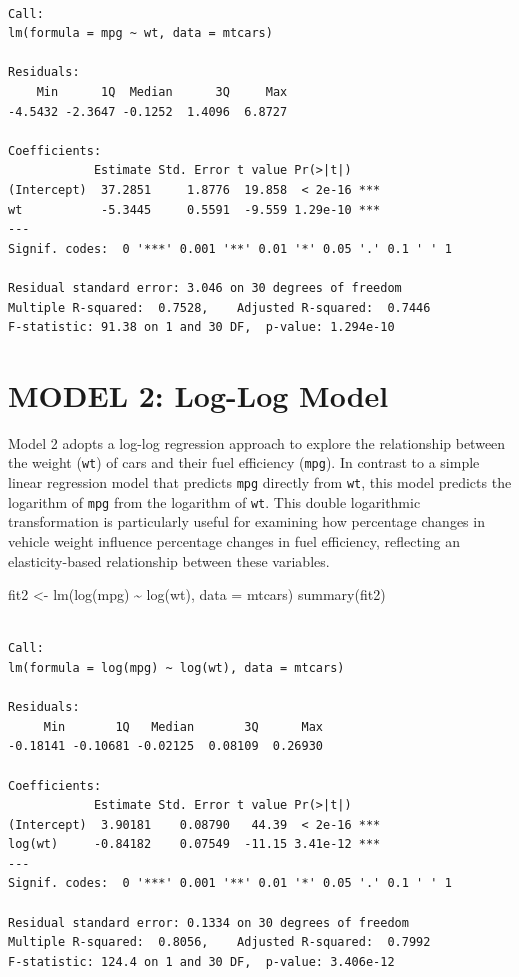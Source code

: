 \documentclass[
  letterpaper,
  DIV=11,
  numbers=noendperiod]{scrreport}
\newenvironment{Shaded}{\begin{snugshade}}{\end{snugshade}}
\newcommand{\AttributeTok}[1]{\textcolor[rgb]{0.40,0.45,0.13}{#1}}
\newcommand{\FunctionTok}[1]{\textcolor[rgb]{0.28,0.35,0.67}{#1}}
\newcommand{\NormalTok}[1]{\textcolor[rgb]{0.00,0.23,0.31}{#1}}
\newcommand{\OtherTok}[1]{\textcolor[rgb]{0.00,0.23,0.31}{#1}}
\newcommand{\SpecialCharTok}[1]{\textcolor[rgb]{0.37,0.37,0.37}{#1}}
\begin{document}
\begin{verbatim}

Call:
lm(formula = mpg ~ wt, data = mtcars)

Residuals:
    Min      1Q  Median      3Q     Max 
-4.5432 -2.3647 -0.1252  1.4096  6.8727 

Coefficients:
            Estimate Std. Error t value Pr(>|t|)    
(Intercept)  37.2851     1.8776  19.858  < 2e-16 ***
wt           -5.3445     0.5591  -9.559 1.29e-10 ***
---
Signif. codes:  0 '***' 0.001 '**' 0.01 '*' 0.05 '.' 0.1 ' ' 1

Residual standard error: 3.046 on 30 degrees of freedom
Multiple R-squared:  0.7528,    Adjusted R-squared:  0.7446 
F-statistic: 91.38 on 1 and 30 DF,  p-value: 1.294e-10
\end{verbatim}

\section{MODEL 2: Log-Log Model}\label{model-2-log-log-model}

Model 2 adopts a log-log regression approach to explore the relationship
between the weight (\texttt{wt}) of cars and their fuel efficiency
(\texttt{mpg}). In contrast to a simple linear regression model that
predicts \texttt{mpg} directly from \texttt{wt}, this model predicts the
logarithm of \texttt{mpg} from the logarithm of \texttt{wt}. This double
logarithmic transformation is particularly useful for examining how
percentage changes in vehicle weight influence percentage changes in
fuel efficiency, reflecting an elasticity-based relationship between
these variables.

\begin{Shaded}
\begin{Highlighting}[]
\NormalTok{fit2 }\OtherTok{\textless{}{-}} \FunctionTok{lm}\NormalTok{(}\FunctionTok{log}\NormalTok{(mpg) }\SpecialCharTok{\textasciitilde{}} \FunctionTok{log}\NormalTok{(wt), }\AttributeTok{data =}\NormalTok{ mtcars)}
\FunctionTok{summary}\NormalTok{(fit2)}
\end{Highlighting}
\end{Shaded}

\begin{verbatim}

Call:
lm(formula = log(mpg) ~ log(wt), data = mtcars)

Residuals:
     Min       1Q   Median       3Q      Max 
-0.18141 -0.10681 -0.02125  0.08109  0.26930 

Coefficients:
            Estimate Std. Error t value Pr(>|t|)    
(Intercept)  3.90181    0.08790   44.39  < 2e-16 ***
log(wt)     -0.84182    0.07549  -11.15 3.41e-12 ***
---
Signif. codes:  0 '***' 0.001 '**' 0.01 '*' 0.05 '.' 0.1 ' ' 1

Residual standard error: 0.1334 on 30 degrees of freedom
Multiple R-squared:  0.8056,    Adjusted R-squared:  0.7992 
F-statistic: 124.4 on 1 and 30 DF,  p-value: 3.406e-12
\end{verbatim}
\end{document}

